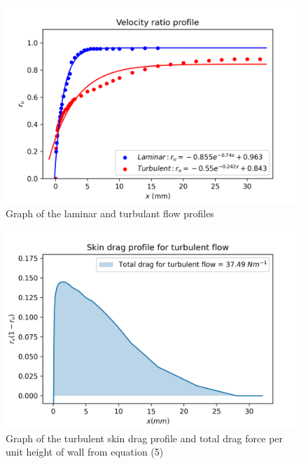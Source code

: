 \documentclass{article}
\begin{document}
\begin{figure}[H]
\centering
\includegraphics[width=1\textwidth]{velocity_profiles.png}
\caption{\label{fig:velocity_profiles} Graph of the laminar and turbulant flow profiles}
\end{figure}

\begin{figure}[H]
\centering
\includegraphics[width=1\textwidth]{turbulent_drag.png}
\caption{\label{fig:turbulent_drag} Graph of the turbulent skin drag profile and total drag force per unit height of wall from equation (5)}
\end{figure}
\end{document}
